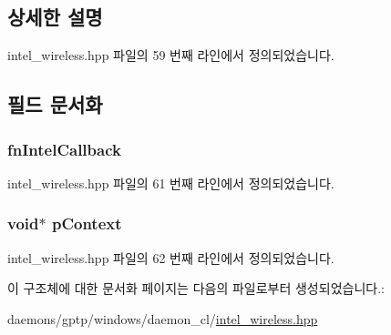 \subsection{상세한 설명}


intel\+\_\+wireless.\+hpp 파일의 59 번째 라인에서 정의되었습니다.



\subsection{필드 문서화}
\subsubsection[{\texorpdfstring{fn\+Intel\+Callback}{fnIntelCallback}}]{ fn\+Intel\+Callback}\hypertarget{struct_i_n_t_e_l___c_a_l_l_b_a_c_k_a34ed9821386ec2f385eedbb1b9e87755}{}\label{struct_i_n_t_e_l___c_a_l_l_b_a_c_k_a34ed9821386ec2f385eedbb1b9e87755}


intel\+\_\+wireless.\+hpp 파일의 61 번째 라인에서 정의되었습니다.

\subsubsection[{\texorpdfstring{p\+Context}{pContext}}]{\setlength{\rightskip}{0pt plus 5cm}void$\ast$ p\+Context}\hypertarget{struct_i_n_t_e_l___c_a_l_l_b_a_c_k_a102e5f449fe313bf3edfe0c51fd3c746}{}\label{struct_i_n_t_e_l___c_a_l_l_b_a_c_k_a102e5f449fe313bf3edfe0c51fd3c746}


intel\+\_\+wireless.\+hpp 파일의 62 번째 라인에서 정의되었습니다.



이 구조체에 대한 문서화 페이지는 다음의 파일로부터 생성되었습니다.\+:\begin{DoxyCompactItemize}
\item 
daemons/gptp/windows/daemon\+\_\+cl/\hyperlink{intel__wireless_8hpp}{intel\+\_\+wireless.\+hpp}\end{DoxyCompactItemize}
